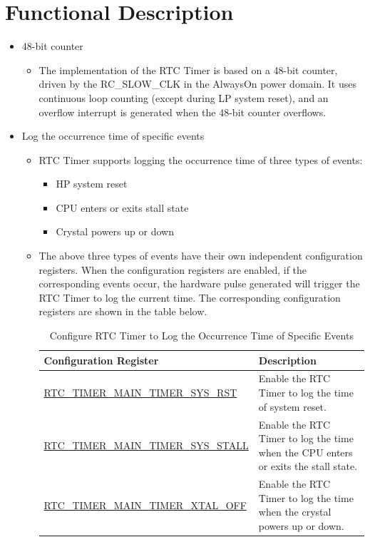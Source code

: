 \documentclass[main\_\_EN.tex]{subfiles}
\begin{document}

\section{Functional Description}
\label{sec:rtctimer-func-descr}

\begin{itemize}
    \item 48-bit counter
    \begin{itemize}
        \item The implementation of the RTC Timer is based on a 48-bit counter, driven by the RC\_SLOW\_CLK in the Always\-On power domain. It uses continuous loop counting (except during LP system reset), and an overflow interrupt is generated when the 48-bit counter overflows.
    \end{itemize}


    \item Log the occurrence time of specific events
    \begin{itemize}
        \item RTC Timer supports logging the occurrence time of three types of events:
        \begin{itemize}
            \item HP system reset
            \item CPU enters or exits stall state
            \item Crystal powers up or down
        \end{itemize}
        \item The above three types of events have their own independent configuration registers. When the configuration registers are enabled, if the corresponding events occur, the hardware pulse generated will trigger the RTC Timer to log the current time. The corresponding configuration registers are shown in the table below.

        \begin{longtable}[c]{|p{6cm}|p{9cm}|}
        \caption{Configure RTC Timer to Log the Occurrence Time of Specific Events} \label{tab:configure-rtc-timer-log-time-of-specific-events}
        \\\hline
        \rowcolor{lightgray}
        \textbf{Configuration Register} & \textbf{Description} \\
        \hline
        \hyperref[regdesc:RTCTIMERUPDATEREG]{RTC\_TIMER\_MAIN\_TIMER\_SYS\_RST} &  Enable the RTC Timer to log the time of system reset. \\
        \hline
        \hyperref[regdesc:RTCTIMERUPDATEREG]{RTC\_TIMER\_MAIN\_TIMER\_SYS\_STALL} & Enable the RTC Timer to log the time when the CPU enters or exits the stall state.\\
        \hline
        \hyperref[regdesc:RTCTIMERUPDATEREG]{RTC\_TIMER\_MAIN\_TIMER\_XTAL\_OFF} &  Enable the RTC Timer to log the time when the crystal powers up or down.\\
        \hline
        \end{longtable}
    \end{itemize}



\end{itemize}
\end{document}
